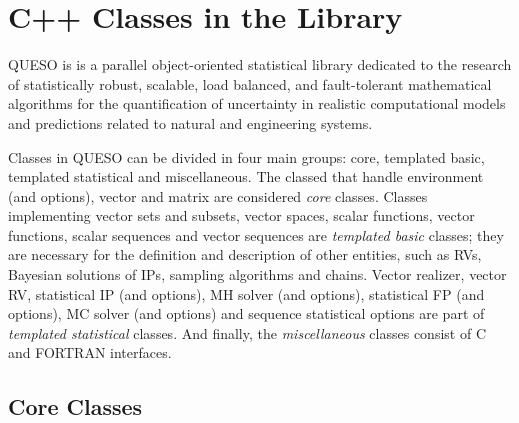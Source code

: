 \chapter{C++ Classes in the Library}\label{ch-classes}
\thispagestyle{headings}



QUESO is is a parallel object-oriented statistical library dedicated to the research of   statistically robust, scalable, load balanced, and fault-tolerant mathematical algorithms for the  quantification of uncertainty in realistic computational models and predictions related to natural and engineering systems.



Classes in QUESO can be divided in four main groups: core, templated basic, templated statistical and miscellaneous.
The classed that handle environment (and options), vector and matrix are considered \textit{core} classes. Classes implementing vector sets and subsets, vector spaces,  scalar functions, vector functions, scalar sequences and vector sequences are \textit{templated basic} classes; they are necessary for the definition and description of other entities, such as RVs, Bayesian solutions of IPs, sampling algorithms and chains.  Vector realizer, vector RV, statistical IP (and options), MH solver (and options), statistical FP (and options), MC solver (and options) and sequence statistical options are part of \textit{templated statistical} classes. And finally, the \textit{miscellaneous} classes consist of C and FORTRAN interfaces.





\section{Core Classes}


